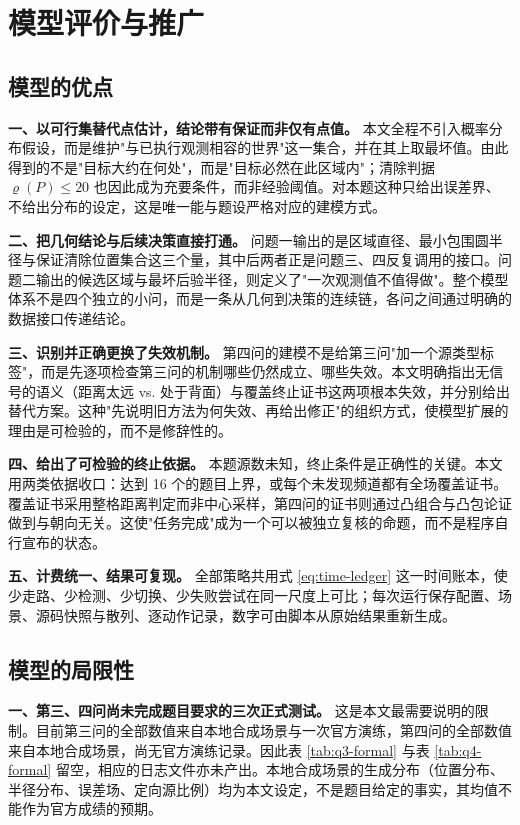 \section{模型评价与推广}

\subsection{模型的优点}

\textbf{一、以可行集替代点估计，结论带有保证而非仅有点值。} 本文全程不引入概率分布假设，而是维护"与已执行观测相容的世界"这一集合，并在其上取最坏值。由此得到的不是"目标大约在何处"，而是"目标必然在此区域内"；清除判据 $\varrho(P)\le20$ 也因此成为充要条件，而非经验阈值。对本题这种只给出误差界、不给出分布的设定，这是唯一能与题设严格对应的建模方式。

\textbf{二、把几何结论与后续决策直接打通。} 问题一输出的是区域直径、最小包围圆半径与保证清除位置集合这三个量，其中后两者正是问题三、四反复调用的接口。问题二输出的候选区域与最坏后验半径，则定义了"一次观测值不值得做"。整个模型体系不是四个独立的小问，而是一条从几何到决策的连续链，各问之间通过明确的数据接口传递结论。

\textbf{三、识别并正确更换了失效机制。} 第四问的建模不是给第三问"加一个源类型标签"，而是先逐项检查第三问的机制哪些仍然成立、哪些失效。本文明确指出无信号的语义（距离太远 vs. 处于背面）与覆盖终止证书这两项根本失效，并分别给出替代方案。这种"先说明旧方法为何失效、再给出修正"的组织方式，使模型扩展的理由是可检验的，而不是修辞性的。

\textbf{四、给出了可检验的终止依据。} 本题源数未知，终止条件是正确性的关键。本文用两类依据收口：达到 16 个的题目上界，或每个未发现频道都有全场覆盖证书。覆盖证书采用整格距离判定而非中心采样，第四问的证书则通过凸组合与凸包论证做到与朝向无关。这使"任务完成"成为一个可以被独立复核的命题，而不是程序自行宣布的状态。

\textbf{五、计费统一、结果可复现。} 全部策略共用式 \eqref{eq:time-ledger} 这一时间账本，使少走路、少检测、少切换、少失败尝试在同一尺度上可比；每次运行保存配置、场景、源码快照与散列、逐动作记录，数字可由脚本从原始结果重新生成。

\subsection{模型的局限性}

\textbf{一、第三、四问尚未完成题目要求的三次正式测试。} 这是本文最需要说明的限制。目前第三问的全部数值来自本地合成场景与一次官方演练，第四问的全部数值来自本地合成场景，尚无官方演练记录。因此表 \ref{tab:q3-formal} 与表 \ref{tab:q4-formal} 留空，相应的日志文件亦未产出。本地合成场景的生成分布（位置分布、半径分布、误差场、定向源比例）均为本文设定，不是题目给定的事实，其均值不能作为官方成绩的预期。

